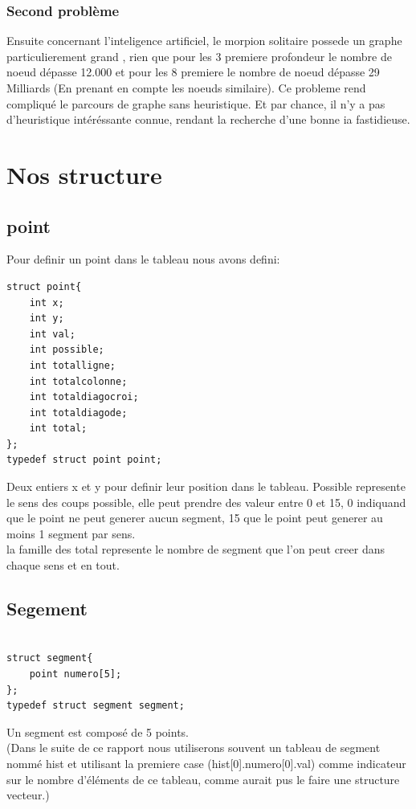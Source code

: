 \documentclass[11pt]{article}
\begin{document}
	\subsubsection{Second problème}
Ensuite concernant l'inteligence artificiel, le morpion solitaire possede un graphe particulierement grand , rien que pour les 3 premiere profondeur le nombre de noeud dépasse 12.000 et pour les 8 premiere le nombre de noeud dépasse 29 Milliards (En prenant en compte les noeuds similaire). Ce probleme rend compliqué le parcours de graphe sans heuristique. Et par chance, il n'y a pas d'heuristique intéréssante connue, rendant la recherche d'une bonne ia fastidieuse.

		\section{Nos  structure}
		\subsection{point}
		Pour definir un point dans le tableau nous avons defini:\newline
		\begin{lstlisting}
struct point{
	int x;
	int y;
	int val;
	int possible;
	int totalligne;
	int totalcolonne;
	int totaldiagocroi;
	int totaldiagode;
	int total;
};
typedef struct point point;

\end{lstlisting}
		Deux entiers x et y pour definir leur position dans le tableau.\newline
		Possible represente le sens des coups possible, elle peut prendre des valeur entre 0 et 15, 0 indiquand que le point ne peut generer aucun segment, 15 que le point peut generer au moins 1 segment par sens.\\
		la famille des total represente le nombre de segment que l'on peut creer dans chaque sens et en tout.\\
		\subsection{Segement}
				\begin{lstlisting}
				
struct segment{
	point numero[5];
};
typedef struct segment segment;

\end{lstlisting}
Un segment est composé de 5 points.\\
(Dans le suite de ce rapport nous utiliserons souvent un tableau de segment nommé hist et utilisant la premiere case (hist[0].numero[0].val) comme indicateur sur le nombre d'éléments de ce tableau, comme aurait pus le faire une structure vecteur.)\\
\end{document}
